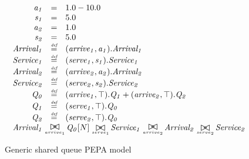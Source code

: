 \begin{figure}
	\caption{Generic shared queue PEPA model}
	\label{figure:pepa_queue_model}
	\centering
	\begin{displaymath}
		\begin{array}{rcl}
			\mathit{a_1} & = & 1.0-10.0\\
			\mathit{s_1} & = & 5.0\\
			\mathit{a_2} & = & 1.0\\
			\mathit{s_2} & = & 5.0\\
			[0.0ex]		\mathit{Arrival_1} & \rmdef & (\mathit{arrive_1},\mathit{a_1}).\mathit{Arrival_1}\\
			\mathit{Service_1} & \rmdef & (\mathit{serve_1},\mathit{s_1}).\mathit{Service_1}\\
			\mathit{Arrival_2} & \rmdef & (\mathit{arrive_2},\mathit{a_2}).\mathit{Arrival_2}\\
			\mathit{Service_2} & \rmdef & (\mathit{serve_2},\mathit{s_2}).\mathit{Service_2}\\
			\mathit{Q_0} & \rmdef & (\mathit{arrive_1},\top).\mathit{Q_1}+(\mathit{arrive_2},\top).\mathit{Q_2}\\
			\mathit{Q_1} & \rmdef & (\mathit{serve_1},\top).\mathit{Q_0}\\
			\mathit{Q_2} & \rmdef & (\mathit{serve_2},\top).\mathit{Q_0}\\
			[0.0ex]		\multicolumn{3}{l}{\mathit{Arrival_1}\sync{arrive_1}\mathit{Q_0}[N]\sync{serve_1}\mathit{Service_1}\sync{arrive_2}\mathit{Arrival_2}\sync{serve_2}\mathit{Service_2}}\\
			[0.0ex]	\end{array}
	\end{displaymath}
\end{figure}


